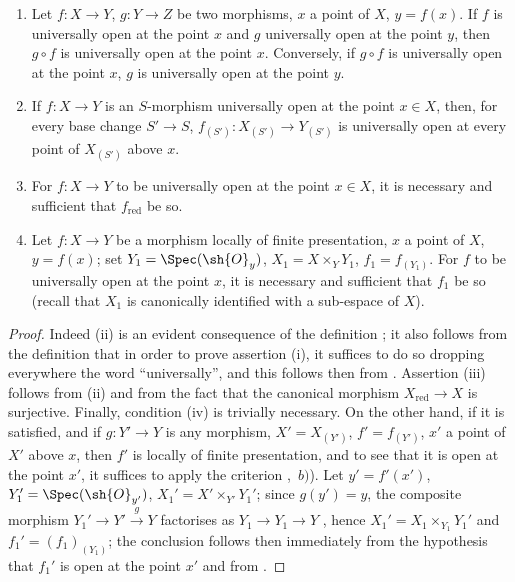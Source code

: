 \begin{proposition}[14.3.4]
\label{IV.14.3.4}
\begin{enumerate}[label=(\roman*)]
  \item Let $f:X\to Y$, $g:Y\to Z$ be two morphisms, $x$ a point of $X$, $y=f(x)$.
  If $f$ is universally open at the point $x$ and $g$ universally open at the point $y$, then $g\circ f$ is universally open at the point $x$.
  Conversely, if $g\circ f$ is universally open at the point $x$, $g$ is universally open at the point $y$.

  \item If $f:X\to Y$ is an $S$-morphism universally open at the point $x\in X$, then, for every base change $S'\to S$, $f_{(S')}:X_{(S')}\to Y_{(S')}$ is universally open at every point of $X_{(S')}$ above $x$.

  \item For $f:X\to Y$ to be universally open at the point $x\in X$, it is necessary and sufficient that $f_{\mathrm{red}}$ be so.

  \item Let $f:X\to Y$ be a morphism locally of finite presentation, $x$ a point of $X$, $y=f(x)$; set $Y_1=\Spec(\sh{O}_y)$, $X_1=X\times_Y Y_1$, $f_1=f_{(Y_1)}$.
  For $f$ to be universally open at the point $x$, it is necessary and sufficient that $f_1$ be so (recall  that $X_1$ is canonically identified with a sub-espace of $X$).
\end{enumerate}
\end{proposition}

\begin{proof}
Indeed (ii) is an evident consequence of the definition ; it also follows from the definition that in order to prove assertion (i), it suffices to do so dropping everywhere the word ``universally'', and this follows then from .
Assertion (iii) follows from (ii) and from the fact that the canonical morphism $X_{\mathrm{red}}\to X$ is surjective.
Finally, condition (iv) is trivially necessary.
On the other hand, if it is satisfied, and if $g:Y'\to Y$ is any morphism, $X'=X_{(Y')}$, $f'=f_{(Y')}$, $x'$ a point of $X'$ above $x$, then $f'$ is locally of finite presentation, and to see that it is open at the point $x'$, it suffices to apply the criterion ,~$b)$).
Let $y'=f'(x')$, $Y_1'=\Spec(\sh{O}_{y'})$, $X_1'=X'\times_{Y'}Y_1'$; since $g(y')=y$, the composite morphism $Y_1'\to Y'\xrightarrow{g}Y$ factorises as $Y_1\to Y_1\to Y$ , hence $X_1'=X_1\times_{Y_1}Y_1'$ and $f_1'=(f_1)_{(Y_1)}$; the conclusion follows then immediately from the hypothesis that $f_1'$ is open at the point $x'$ and from .
\end{proof}

